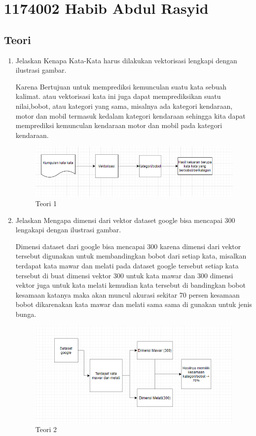 \section{1174002 Habib Abdul Rasyid}

\subsection{Teori}
\begin{enumerate}

\item Jelaskan Kenapa Kata-Kata harus dilakukan vektorisasi lengkapi dengan ilustrasi gambar.\par
Karena Bertujuan untuk memprediksi kemunculan suatu kata sebuah kalimat. atau vektorisasi kata ini juga dapat memprediksikan
suatu nilai,bobot, atau kategori yang sama, misalnya ada kategori kendaraan, motor dan mobil termasuk kedalam kategori kendaraan sehingga kita dapat memprediksi kemunculan kendaraan motor dan mobil pada kategori kendaraan.

\begin{figure}[ht]
\centering
\includegraphics[scale=0.3]{figures/1174002/chapter5/1.PNG}
\caption{Teori 1}
\label{contoh}
\end{figure}

\item Jelaskan Mengapa dimensi dari vektor dataset google bisa mencapai 300 lengakapi dengan ilustrasi gambar. \par
Dimensi dataset dari google bisa mencapai 300 karena dimensi dari vektor tersebut digunakan untuk membandingkan bobot dari setiap kata, misalkan terdapat kata mawar dan melati pada dataset google tersebut setiap kata tersebut di buat dimensi vektor 300 untuk kata mawar dan 300 dimensi vektor juga untuk kata melati kemudian kata tersebut di bandingkan bobot kesamaan katanya maka akan muncul akurasi sekitar 70 persen kesamaan bobot dikarenakan kata mawar dan melati sama sama di gunakan untuk jenis bunga.

\begin{figure}[ht]
\centering
\includegraphics[scale=0.3]{figures/1174002/chapter5/2.PNG}
\caption{Teori 2}
\label{contoh}
\end{figure}


\end{enumerate}
